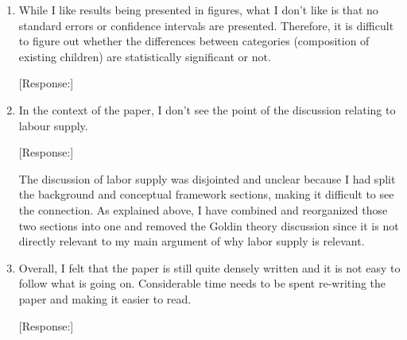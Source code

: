 \documentclass[letterpaper,12pt]{article}
\begin{document}
\begin{enumerate}
[Response:]

The 2004 break is an attempt to understand whether we are observing the beginning of
a reversal in son preference and the use of sex selection as hypothesized by part of
the prior literature.
In the ``Data'' section, I have split the paragraph on the periods into two and expanded 
the discussion of the motivation for the breaks, including adding two additional
references arguing that we might see the reversal.
Clearly, the 2004/05 break is somewhat arbitrary, but does have the advantage of making 
the periods close to the same length (there are relatively few birth intervals that begin 
in 2015 and 2016).

\item While I like results being presented in figures, what I don’t like
is that no standard errors or confidence intervals are presented.
Therefore, it is difficult to figure out whether the differences between
categories (composition of existing children) are statistically
significant or not.

[Response:]

\item In the context of the paper, I don’t see the point of the
discussion relating to labour supply.

[Response:]

The discussion of labor supply was disjointed and unclear because I had split the 
background and conceptual framework sections, making it difficult to see the connection.
As explained above, I have combined and reorganized those two sections into one and
removed the Goldin theory discussion since it is not directly relevant to my main
argument of why labor supply is relevant.


\item Overall, I felt that the paper is still quite densely written and
it is not easy to follow what is going on. Considerable time needs to be
spent re-writing the paper and making it easier to read.

[Response:]

\end{enumerate}



\newpage


\end{document}
